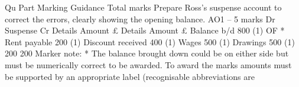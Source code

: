 \documentclass{article}
\begin{document}
Qu \newline
Part \newline
Marking Guidance \newline
Total \newline
marks   \newline
Prepare Ross’s suspense account to correct the errors, clearly showing the \newline
opening balance.  \newline
 \newline
AO1 – 5 marks \newline
 \newline
Dr \newline
Suspense \newline
 \newline
Cr \newline
Details \newline
Amount \newline
£ \newline
Details \newline
Amount \newline
£ \newline
Balance b/d  800 (1) OF * Rent payable  200 (1) \newline
Discount received  400 (1) \newline
Wages  500 (1) \newline
  \newline
    \newline
Drawings  500 (1) \newline
   200  \newline
   200  \newline
 \newline
Marker note: \newline
 \newline
* The balance brought down could be on either side but must be numerically correct to be awarded. \newline
 \newline
To award the marks amounts must be supported by an appropriate label (recognisable abbreviations are \newline
\end{document}
